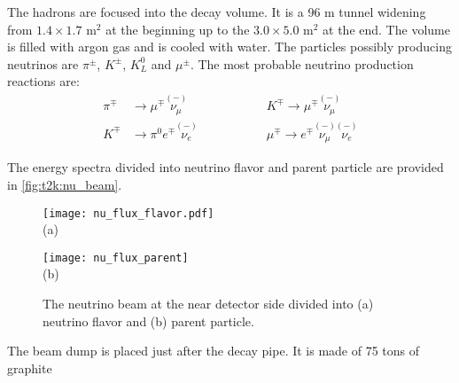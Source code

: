 \documentclass[../main.tex]{subfiles}
\begin{document}
The hadrons are focused into the decay volume. It is a 96 m tunnel widening from $1.4\times1.7\text{ m}^2$ at the beginning up to the $3.0\times5.0 \text{ m}^2$ at the end. The volume is filled with argon gas and is cooled with water. The particles possibly producing neutrinos are $\pi^\pm$, $K^\pm$, $K^0_L$ and $\mu^\pm$. The most probable neutrino production reactions are:
\begin{align}
\pi^\mp&\to\mu^\mp\overset{\scriptscriptstyle(-)}{\nu_\mu} \hspace{2cm} &K^\mp\to\mu^\mp\overset{\scriptscriptstyle(-)}{\nu_\mu} \\
K^\mp&\to\pi^0e^\mp\overset{\scriptscriptstyle(-)}{\nu_e} \hspace{2cm}  &\mu^\mp\to e^\mp\overset{\scriptscriptstyle(-)}{\nu_\mu}\overset{\scriptscriptstyle(-)}{\nu_e}
\end{align}

The energy spectra divided into neutrino flavor and parent particle are provided in \autoref{fig:t2k:nu_beam}.

\begin{figure}[!ht]
  \begin{minipage}{0.49\linewidth}
    \centering
    \texttt{[image: nu\_flux\_flavor.pdf]} \\ (a)
  \end{minipage}
  \begin{minipage}{0.49\linewidth}
    \centering
    \texttt{[image: nu\_flux\_parent]} \\ (b)
  \end{minipage}
  \caption{The neutrino beam at the near detector side divided into (a) neutrino flavor and (b) parent particle.}
  \label{fig:t2k:nu_beam}
\end{figure}

The beam dump is placed just after the decay pipe. It is made of 75 tons of graphite 
\end{document}
